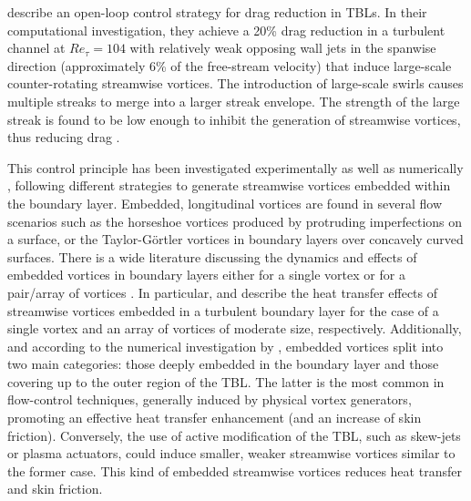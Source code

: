 \citet{Schoppa1998} describe an open-loop control strategy for drag reduction in TBLs. In their computational investigation, they achieve a 20\% drag reduction in a turbulent channel at $Re_\tau=104$ with relatively weak opposing wall jets in the spanwise direction (approximately 6\% of the free-stream velocity) that induce large-scale counter-rotating streamwise vortices. The introduction of large-scale swirls causes multiple streaks to merge into a larger streak envelope. The strength of the large streak is found to be low enough to inhibit the generation of streamwise vortices, thus reducing drag \citep{schoppa2002}.

This control principle has been investigated experimentally \citep{iuso2002,cheng_wong_hussain_schroder_zhou_2021} as well as numerically \citep{yao2017,yao2018}%
, following different strategies to generate streamwise vortices embedded within the boundary layer. {Embedded, longitudinal vortices are found in several flow scenarios such as the horseshoe vortices produced by protruding imperfections on a surface, or the Taylor-G\"ortler vortices in boundary layers over concavely curved surfaces. There is a wide literature discussing the dynamics and effects of embedded vortices in boundary layers either for a single vortex \citep{shabaka1985} or for a pair/array of vortices \citep{mehta1988,Pauley1988,You2006}.} 
In particular, \citet{Eibeck1987} and \citet{Pauley1994} describe the heat transfer effects of streamwise vortices embedded in a turbulent boundary layer for the case of a single vortex and an array of vortices of moderate size, respectively. Additionally, and according to the numerical investigation by \citet{Zhang1993}, embedded vortices split into two main categories: those deeply embedded in the boundary layer and those covering up to the outer region of the TBL. The latter is the most common in flow-control techniques, generally induced by physical vortex generators, promoting an effective heat transfer enhancement (and an increase of skin friction). Conversely, the use of active modification of the TBL, such as skew-jets or plasma actuators, could induce smaller, weaker streamwise vortices similar to the former case. This kind of embedded streamwise vortices reduces heat transfer and skin friction.

